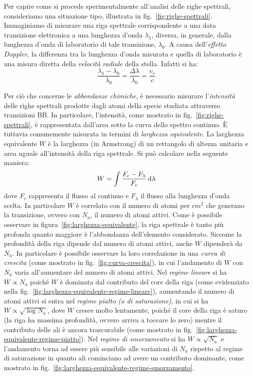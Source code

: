 Per capire come si procede sperimentalmente all'analisi delle righe spettrali, consideriamo una situazione tipo, illustrata in fig.~\ref{fig:righe-spettrali}. Immaginiamo di misurare una riga spettrale corrispondente a una data transizione elettronica a una lunghezza d'onda $\lambda_1$, diversa, in generale, dalla lunghezza d'onda di laboratorio di tale transizione, $\lambda_0$. A causa dell'\emph{effetto Doppler}, la differenza tra la lunghezza d'onda misurata e quella di laboratorio è una misura diretta della \emph{velocità radiale} della stella. Infatti si ha:
\begin{equation}\label{eq:effetto-doppler}
    \dfrac{\lambda_1 - \lambda_0}{\lambda_0} = \dfrac{\Delta \lambda}{\lambda_0} = \dfrac{v_r}{c}
\end{equation}

Per ciò che concerne le \emph{abbondanze chimiche}, è necessario misurare l'\emph{intensità} delle righe spettrali prodotte dagli atomi della specie studiata attraverso transizioni BB. In particolare, l'intensità, come mostrato in fig.~\ref{fig:righe-spettrali}, è rappresentata dall'area sotto la curva dello spettro continuo. È tuttavia comunemente misurata in termini di \emph{larghezza equivalente}. La larghezza equivalente $W$ è la larghezza (in Armstrong) di un rettangolo di altezza unitaria e area uguale all'intensità della riga spettrale. Si può calcolare nella seguente maniera:
\begin{equation}\label{eq:larghezza-equivalente}
    W = \int \dfrac{F_c - F_\lambda}{F_c} \mathop{\mathrm{{}d}}\mathopen{} \lambda
\end{equation} 
dove $F_c$ rappresenta il flusso al continuo e $F_\lambda$ il flusso alla lunghezza d'onda scelta. In particolare $W$ è correlato con il numero di atomi per $\si{cm^2}$ che generano la transizione, ovvero con $N_a$, il numero di atomi attivi. Come è possibile osservare in figura~\ref{fig:larghezza-equivalente}, la riga spettrale è tanto più profonda quanto maggiore è l'abbondanza dell'elemento considerato. Siccome la profondità della riga dipende dal numero di atomi attivi, anche $W$ dipenderà da $N_a$. In particolare è possibile osservare la loro correlazione in una \emph{curva di crescita} (come mostrato in fig.~\ref{fig:curva-crescita}), in cui l'andamento di $W$ con $N_a$ varia all'aumentare del numero di atomi attivi. Nel \emph{regime lineare} si ha $W \propto N_a$ poiché $W$ è dominata dal contributo del core della riga (come evidenziato nella fig.~\ref{fig:larghezza-equivalente-regime-lineare}), aumentando il numero di atomi attivi si entra nel \emph{regime piatto (o di saturazione)}, in cui si ha $W \propto \sqrt{\log N_a}$, dove $W$ cresce molto lentamente, poiché il core della riga è saturo (la riga ha massima profondità, ovvero arriva a toccare lo zero) mentre il contributo delle ali è ancora trascurabile (come mostrato in fig.~\ref{fig:larghezza-equivalente-regime-piatto}). Nel \emph{regime di smorzamento} si ha $W \propto \sqrt{N_a}$ e l'andamento torna ad essere più sensibile alle variazioni di $N_a$ rispetto al regime di saturazione in quanto ali cominciano ad avere un contributo dominante, come mostrato in fig.~\ref{fig:larghezza-equivalente-regime-smorzamento}.

